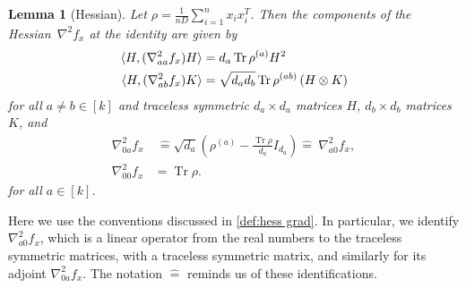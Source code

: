 \documentclass[aos]{imsart}
\newtheorem{lemma}[theorem]{Lemma}
\theoremstyle{definition}
\numberwithin{equation}{section}
\DeclareMathOperator{\tr}{Tr}
\newcommand{\ot}{\otimes}
\newcommand{\samp}{x}
\begin{document}
\begin{lemma}[Hessian]\label{lem:hessian}
Let $\rho = \frac{1}{nD}\sum_{i=1}^n \samp_i \samp_i^T$.
Then the components of the Hessian~$\nabla^2 f_{\samp}$ at the identity are given by
\begin{align*}
  \braket{H, (\nabla^2_{aa} f_x) H} &= d_a \tr \rho^{(a)} H^2 \\
  \braket{H, (\nabla^2_{ab} f_x) K} &= \sqrt{d_a d_b} \tr \rho^{(ab)} \left( H \ot K \right)
\end{align*}
for all $a\neq b\in[k]$ and traceless symmetric $d_a\times d_a$ matrices $H$, $d_b\times d_b$ matrices~$K$, and
\begin{align*}
  \nabla^2_{0a} f_x&~\widehat= \sqrt{d_a} \left( \rho^{(a)} - \frac{\tr \rho}{d_a} I_{d_a} \right) \widehat=~ \nabla^2_{a0} f_x, \\
  \nabla^2_{00} f_x&= \tr \rho.
\end{align*}
for all $a \in [k]$.
\end{lemma}

\noindent
Here we use the conventions discussed in \cref{def:hess grad}.
In particular, we identify $\nabla^2_{a0} f_x$, which is a linear operator from the real numbers to the traceless symmetric matrices, with a traceless symmetric matrix, and similarly for its adjoint $\nabla^2_{0a} f_x$.
The notation $\widehat=$ reminds us of these identifications.
\end{document}
